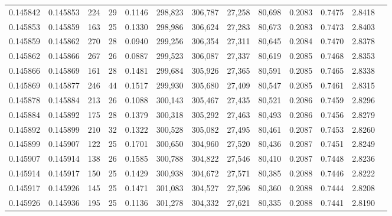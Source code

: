 \begin{tabular}{rrrrrrrrrrrrr}
0.145842 & 0.145853 & 224 &  29 &                                     0.1146 & 298,823 & 306,787 &  27,258 &  80,698 & 0.2083 & 0.7475 & 2.8418 \\
0.145853 & 0.145859 & 163 &  25 &                                     0.1330 & 298,986 & 306,624 &  27,283 &  80,673 & 0.2083 & 0.7473 & 2.8403 \\
0.145859 & 0.145862 & 270 &  28 &                                     0.0940 & 299,256 & 306,354 &  27,311 &  80,645 & 0.2084 & 0.7470 & 2.8378 \\
0.145862 & 0.145866 & 267 &  26 &                                     0.0887 & 299,523 & 306,087 &  27,337 &  80,619 & 0.2085 & 0.7468 & 2.8353 \\
0.145866 & 0.145869 & 161 &  28 &                                     0.1481 & 299,684 & 305,926 &  27,365 &  80,591 & 0.2085 & 0.7465 & 2.8338 \\
0.145869 & 0.145877 & 246 &  44 &                                     0.1517 & 299,930 & 305,680 &  27,409 &  80,547 & 0.2085 & 0.7461 & 2.8315 \\
0.145878 & 0.145884 & 213 &  26 &                                     0.1088 & 300,143 & 305,467 &  27,435 &  80,521 & 0.2086 & 0.7459 & 2.8296 \\
0.145884 & 0.145892 & 175 &  28 &                                     0.1379 & 300,318 & 305,292 &  27,463 &  80,493 & 0.2086 & 0.7456 & 2.8279 \\
0.145892 & 0.145899 & 210 &  32 &                                     0.1322 & 300,528 & 305,082 &  27,495 &  80,461 & 0.2087 & 0.7453 & 2.8260 \\
0.145899 & 0.145907 & 122 &  25 &                                     0.1701 & 300,650 & 304,960 &  27,520 &  80,436 & 0.2087 & 0.7451 & 2.8249 \\
0.145907 & 0.145914 & 138 &  26 &                                     0.1585 & 300,788 & 304,822 &  27,546 &  80,410 & 0.2087 & 0.7448 & 2.8236 \\
0.145914 & 0.145917 & 150 &  25 &                                     0.1429 & 300,938 & 304,672 &  27,571 &  80,385 & 0.2088 & 0.7446 & 2.8222 \\
0.145917 & 0.145926 & 145 &  25 &                                     0.1471 & 301,083 & 304,527 &  27,596 &  80,360 & 0.2088 & 0.7444 & 2.8208 \\
0.145926 & 0.145936 & 195 &  25 &                                     0.1136 & 301,278 & 304,332 &  27,621 &  80,335 & 0.2088 & 0.7441 & 2.8190 \\

\end{tabular}
